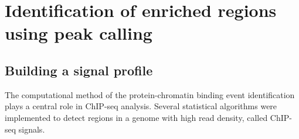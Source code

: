 \chapter{Identification of enriched regions using peak calling}

\section{Building a signal profile}

The computational method of the protein-chromatin binding event identification plays a central role in ChIP-seq analysis. Several statistical algorithms were implemented to detect regions in a genome with high read density, called ChIP-seq signals.





